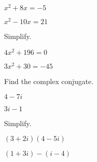 \documentclass{report}
\theoremstyle{definition}
\begin{document}
\begin{enumerate}
\setcounter{enumi}{10}

	\begin{minipage}[t]{0.45\linewidth}
	\item $x^2+8x=-5$ 
		\vspace{1cm}
	\end{minipage}
	\hfill
	\begin{minipage}[t]{0.45\linewidth}
	\item $x^2-10x=21$
		\vspace{1cm}
	\end{minipage}

\end{enumerate}

\noindent Simplify.\\

\begin{enumerate}
\setcounter{enumi}{12}
	\begin{minipage}[t]{0.45\linewidth}
		\item $4x^2+196=0$
		\vspace{1cm}
	\end{minipage}
	\hfill
	\begin{minipage}[t]{0.45\linewidth}
		\item $3x^2+30=-45$
		\vspace{1cm}
	\end{minipage}

\end{enumerate}

\noindent Find the complex conjugate.\\

\begin{enumerate}
\setcounter{enumi}{14}
	\begin{minipage}[t]{0.45\linewidth}
		\item $4-7i$
		\vspace{0.5cm}
	\end{minipage}
	\hfill
	\begin{minipage}[t]{0.45\linewidth}
		\item $3i-1$
		\vspace{0.5cm}
	\end{minipage}

\end{enumerate}


\noindent Simplify.\\

\begin{enumerate}
\setcounter{enumi}{16}
	\begin{minipage}[t]{0.45\linewidth}
		\item $(3+2i)(4-5i)$
		\vspace{1cm}
	\end{minipage}
	\hfill
	\begin{minipage}[t]{0.45\linewidth}
		\item $(1+3i)-(i-4)$
		\vspace{1cm}
	\end{minipage}

\end{enumerate}
\end{document}
